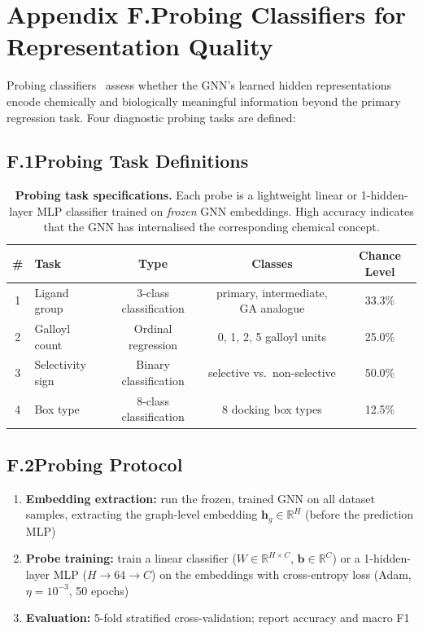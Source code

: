 \documentclass[11pt]{article}
\begin{document}
\label{app:screen_end}

\section*{Appendix F.\quad Probing Classifiers for Representation Quality}
\label{app:probing}

Probing classifiers~\cite{belinkov2022probing} assess whether the GNN's
learned hidden representations encode chemically and biologically
meaningful information beyond the primary regression task.
Four diagnostic probing tasks are defined:

\subsection*{F.1\quad Probing Task Definitions}

\begin{table}[H]
\small
\centering
\caption{\textbf{Probing task specifications.}
  Each probe is a lightweight linear or 1-hidden-layer MLP classifier
  trained on \emph{frozen} GNN embeddings.
  High accuracy indicates that the GNN has internalised the
  corresponding chemical concept.}
\label{tab:app_probing}
\begin{tabular}{clccc}
\toprule
\textbf{\#} & \textbf{Task} & \textbf{Type}
  & \textbf{Classes} & \textbf{Chance Level} \\
\midrule
1 & Ligand group  & 3-class classification
  & primary, intermediate, GA analogue & 33.3\% \\
2 & Galloyl count & Ordinal regression
  & 0, 1, 2, 5 galloyl units & 25.0\% \\
3 & Selectivity sign & Binary classification
  & selective vs.\ non-selective & 50.0\% \\
4 & Box type      & 8-class classification
  & 8 docking box types & 12.5\% \\
\bottomrule
\end{tabular}
\end{table}

\subsection*{F.2\quad Probing Protocol}

\begin{enumerate}[leftmargin=1.5em]
  \item \textbf{Embedding extraction:} run the frozen, trained GNN on
    all dataset samples, extracting the graph-level embedding
    $\mathbf{h}_g \in \mathbb{R}^{H}$ (before the prediction MLP)
  \item \textbf{Probe training:} train a linear classifier
    ($W \in \mathbb{R}^{H \times C}$, $\mathbf{b} \in \mathbb{R}^C$)
    or a 1-hidden-layer MLP ($H \to 64 \to C$) on the embeddings
    with cross-entropy loss (Adam, $\eta = 10^{-3}$, 50 epochs)
  \item \textbf{Evaluation:} 5-fold stratified cross-validation;
    report accuracy and macro F1
\end{enumerate}
\end{document}

